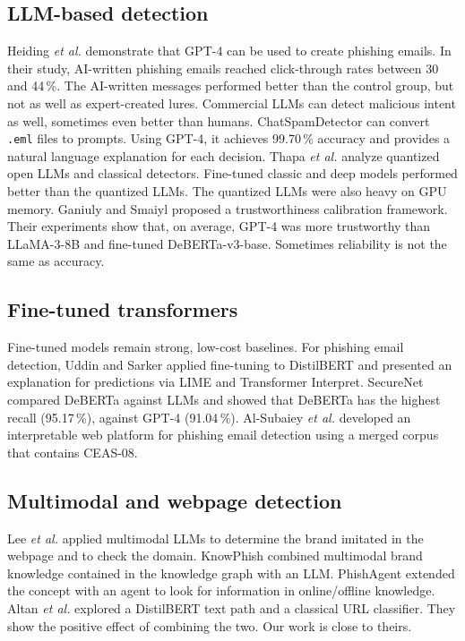 \documentclass[conference]{IEEEtran}
\begin{document}
\subsection{LLM-based detection}
Heiding \emph{et al.} \cite{heiding2024devising} demonstrate that GPT-4 can be used to create phishing emails. In their study, AI-written phishing emails reached click-through rates between 30 and 44\,\%. The AI-written messages performed better than the control group, but not as well as expert-created lures. Commercial LLMs can detect malicious intent as well, sometimes even better than humans. ChatSpamDetector \cite{koide2024chatspamdetector} can convert \texttt{.eml} files to prompts. Using GPT-4, it achieves 99.70\,\% accuracy and provides a natural language explanation for each decision. Thapa \emph{et al.} \cite{thapa2025quantized} analyze quantized open LLMs and classical detectors. Fine-tuned classic and deep models performed better than the quantized LLMs. The quantized LLMs were also heavy on GPU memory. Ganiuly and Smaiyl \cite{ganiuly2025trust} proposed a trustworthiness calibration framework. Their experiments show that, on average, GPT-4 was more trustworthy than LLaMA-3-8B and fine-tuned DeBERTa-v3-base. Sometimes reliability is not the same as accuracy.

\subsection{Fine-tuned transformers}
Fine-tuned models remain strong, low-cost baselines. For phishing email detection, Uddin and Sarker \cite{uddin2024explainable} applied fine-tuning to DistilBERT and presented an explanation for predictions via LIME and Transformer Interpret. SecureNet \cite{mahendru2024securenet} compared DeBERTa against LLMs and showed that DeBERTa has the highest recall (95.17\,\%), against GPT-4 (91.04\,\%). Al-Subaiey \emph{et al.} \cite{alsubaiey2024novel} developed an interpretable web platform for phishing email detection using a merged corpus that contains CEAS-08.

\subsection{Multimodal and webpage detection}
Lee \emph{et al.} \cite{lee2024mllm} applied multimodal LLMs to determine the brand imitated in the webpage and to check the domain. KnowPhish \cite{li2024knowphish} combined multimodal brand knowledge contained in the knowledge graph with an LLM. PhishAgent \cite{cao2025phishagent} extended the concept with an agent to look for information in online/offline knowledge. Altan \emph{et al.} \cite{altan2025dualpath} explored a DistilBERT text path and a classical URL classifier. They show the positive effect of combining the two. Our work is close to theirs.
\end{document}
